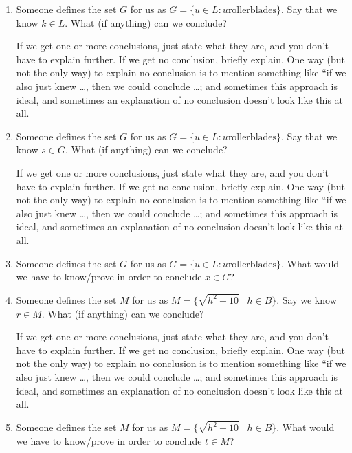 \documentclass{article}
\begin{document}
\begin{enumerate}

    \item Someone defines the set $G$ for us as $G = \{u \in L : u \text{
                  rollerblades}\}$. Say that we know $k \in L$. What (if anything) can we
          conclude?

          If we get one or more conclusions, just state what they are, and you don't have
          to explain further. If we get no conclusion, briefly explain. One way (but not
          the only way) to explain no conclusion is to mention something like ``if we
          also just knew \ldots, then we could conclude \ldots; and sometimes this approach
          is ideal, and sometimes an explanation of no conclusion doesn't look like this
          at all.

    \item Someone defines the set $G$ for us as $G = \{u \in L : u \text{
                  rollerblades}\}$. Say that we know $s \in G$. What (if anything) can we
          conclude?

          If we get one or more conclusions, just state what they are, and you don't have
          to explain further. If we get no conclusion, briefly explain. One way (but not
          the only way) to explain no conclusion is to mention something like ``if we
          also just knew \ldots, then we could conclude \ldots; and sometimes this approach
          is ideal, and sometimes an explanation of no conclusion doesn't look like this
          at all.

    \item Someone defines the set $G$ for us as $G = \{u \in L : u \text{
                  rollerblades}\}$. What would we have to know/prove in order to conclude $x \in
              G$?

    \item Someone defines the set $M$ for us as $M = \{\sqrt{h^2+10} \mid h \in B\}$. Say
          we know $r \in M$. What (if anything) can we conclude?

          If we get one or more conclusions, just state what they are, and you don't have
          to explain further. If we get no conclusion, briefly explain. One way (but not
          the only way) to explain no conclusion is to mention something like ``if we
          also just knew \ldots, then we could conclude \ldots; and sometimes this approach
          is ideal, and sometimes an explanation of no conclusion doesn't look like this
          at all.

    \item Someone defines the set $M$ for us as $M = \{\sqrt{h^2+10} \mid h \in B\}$.
          What would we have to know/prove in order to conclude $t \in M$?

\end{enumerate}
\end{document}
